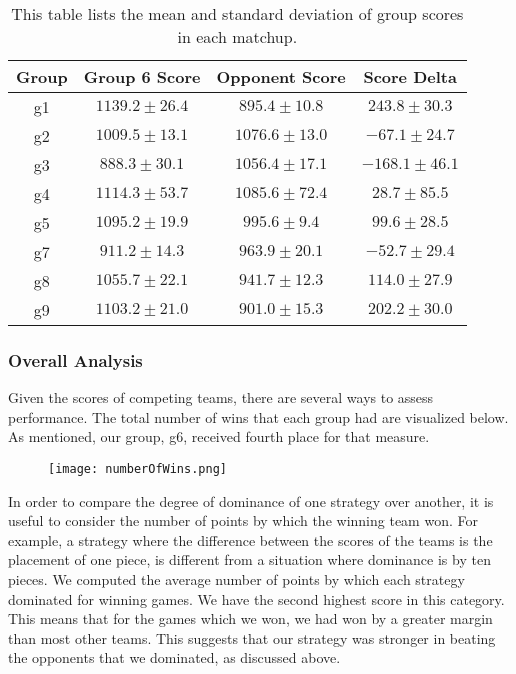\documentclass{scrartcl}
\begin{document}
\begin{table}[H]
\centering
\caption{This table lists the mean and standard deviation of group scores in each matchup.}
\label{tab:tournament3}

\begin{tabular}{|c|c|c|c|} \hline
Group & Group 6 Score & Opponent Score & Score Delta \\ \hline
g1 & $1139.2 \pm 26.4$ & $895.4 \pm 10.8$ & $243.8 \pm 30.3$ \\ \hline
g2 & $1009.5 \pm 13.1$ & $1076.6 \pm 13.0$ & $-67.1 \pm 24.7$ \\ \hline
g3 & $888.3 \pm 30.1$ & $1056.4 \pm 17.1$ & $-168.1 \pm 46.1$ \\ \hline
g4 & $1114.3 \pm 53.7$ & $1085.6 \pm 72.4$ & $28.7 \pm 85.5$ \\ \hline
g5 & $1095.2 \pm 19.9$ & $995.6 \pm 9.4$ & $99.6 \pm 28.5$ \\ \hline
g7 & $911.2 \pm 14.3$ & $963.9 \pm 20.1$ & $-52.7 \pm 29.4$ \\ \hline
g8 & $1055.7 \pm 22.1$ & $941.7 \pm 12.3$ & $114.0 \pm 27.9$ \\ \hline
g9 & $1103.2 \pm 21.0$ & $901.0 \pm 15.3$ & $202.2 \pm 30.0$ \\ \hline
\end{tabular}
\end{table}

\subsubsection{Overall Analysis}

Given the scores of competing teams, there are several ways to assess performance. The total number of wins that each group had are visualized below. As mentioned, our group, g6, received fourth place for that measure.

\begin{figure}[H]
  \texttt{[image: numberOfWins.png]}
\end{figure}

In order to compare the degree of dominance of one strategy over another, it is useful to consider the number of points by which the winning team won. For example, a strategy where the difference between the scores of the teams is the placement of one piece, is different from a situation where dominance is by ten pieces. We computed the average number of points by which each strategy dominated for winning games. We have the second highest score in this category. This means that for the games which we won, we had won by a greater margin than most other teams. This suggests that our strategy was stronger in beating the opponents that we dominated, as discussed above.  
\end{document}
